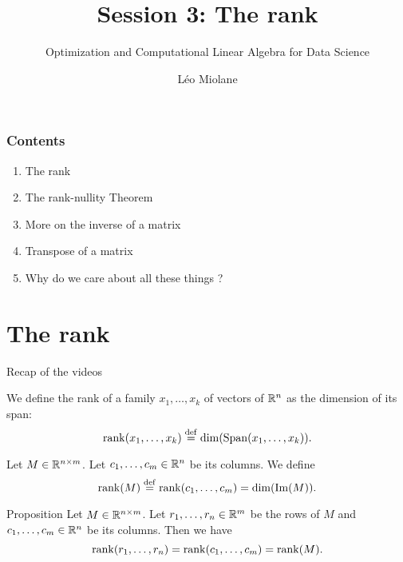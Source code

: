 \documentclass{beamer}
\title{Session 3: The rank}
\subtitle{Optimization and Computational Linear Algebra for Data Science}
\author{Léo Miolane}
\date{}
\begin{document}
\setcounter{showProgressBar}{0}
\setcounter{showSlideNumbers}{0}

\frame{\titlepage}

\begin{frame}
	\frametitle{Contents}
	\begin{enumerate}
		\item The rank
		\item The rank-nullity Theorem
		\item More on the inverse of a matrix
		\item Transpose of a matrix
		\item Why do we care about all these things ? 
	\end{enumerate}
\end{frame}


\setcounter{framenumber}{0}
\setcounter{showSlideNumbers}{1}

\section{The rank}

\begin{frame}[t]{Recap of the videos}
	\vspace{-0.4cm}
	\begin{definition}
		We define the rank of a family $x_1, \dots, x_k$ of vectors of $\mathbb{R}^n$ as the dimension of its span:
		\vspace{-0.3cm}
		$$
		\rank(x_1, \dots, x_k) \defeq \dim (\Span(x_1, \dots, x_k)).
		\vspace{-0.3cm}
		$$
	\end{definition}

	\begin{definition}
		Let $M \in \mathbb{R}^{n \times m}$. Let $c_1, \dots, c_m \in \mathbb{R}^n$ be its columns.
		We define
		\vspace{-0.3cm}
		$$
		\rank(M) \defeq \rank(c_1, \dots, c_m) = \dim(\Im(M)).
		\vspace{-0.3cm}
		$$
	\end{definition}

	\begin{block}{Proposition}
		Let $M \in \mathbb{R}^{n \times m}$. Let $r_1, \dots, r_n \in \mathbb{R}^m$ be the rows of $M$ and $c_1, \dots, c_m \in \mathbb{R}^n$ be its columns.
		Then we have
		\vspace{-0.3cm}
		$$
		\rank(r_1, \dots, r_n) = \rank(c_1, \dots, c_m) = \rank(M).
		\vspace{-0.3cm}
		$$
	\end{block}

\end{frame}
\end{document}

